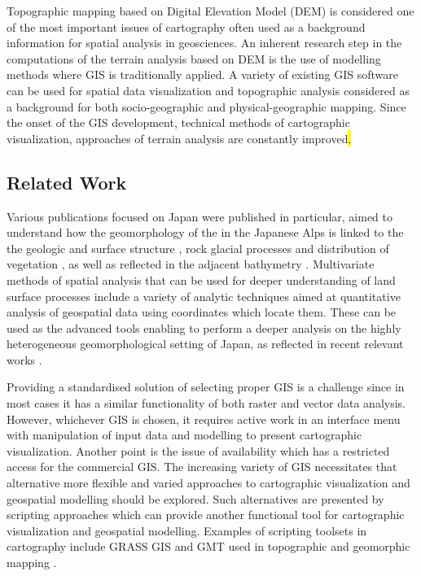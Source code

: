 \documentclass[land,article,submit,pdftex,moreauthors]{Definitions/mdpi}
\begin{document}
Topographic mapping based on Digital Elevation Model (DEM) is considered one of the most important issues of cartography often used as a background information for spatial analysis in geosciences. An inherent research step in the computations of the terrain analysis based on DEM is the use of modelling methods where GIS is traditionally applied. A variety of existing GIS software can be used for spatial data visualization and topographic analysis considered as a background for both socio-geographic and physical-geographic mapping. Since the onset of the GIS development, technical methods of cartographic visualization, approaches of terrain analysis are constantly improved\hl{.} 

\subsection{Related Work}

Various publications focused on Japan were published in particular, aimed to understand how the geomorphology of the in the Japanese Alps is linked to the the geologic and surface structure \cite{MATSUOKA201965}, rock glacial processes and distribution of vegetation \cite{FUJINO2023100146}, as well as reflected in the adjacent bathymetry \cite{Kariya2002}. Multivariate methods of spatial analysis that can be used for deeper understanding of land surface processes include a variety of analytic techniques aimed at quantitative analysis of geospatial data using  coordinates which locate them. These can be used as the advanced tools enabling to perform a deeper analysis on the highly heterogeneous geomorphological setting of Japan, as reflected in recent relevant works \cite{Oguchi2000,OGUCHI2020106805,MATSUURA2015133,NIWA2021107835,HATTANJI2021107943}. 

Providing a standardised solution of selecting proper GIS is a challenge since in most cases it has a similar functionality of both raster and vector data analysis. However, whichever GIS is chosen, it requires active work in an interface menu with manipulation of input data and modelling to present cartographic visualization. Another point is the issue of availability which has a restricted access for the commercial GIS. The increasing variety of GIS necessitates that alternative more flexible and varied approaches to cartographic visualization and geospatial modelling should be explored. Such alternatives are presented by scripting approaches which can provide another functional tool for cartographic visualization and geospatial modelling. Examples of scripting toolsets in cartography include GRASS GIS \cite{Lemenkova202016,Lemenkova202026} and GMT used in topographic and geomorphic mapping \cite{ijgi11090473,geosciences12030140}. 
\end{document}
